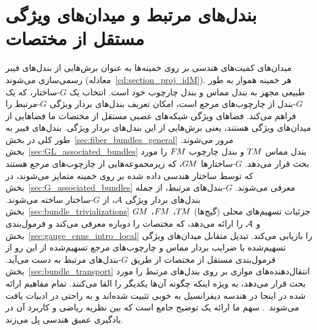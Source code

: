 \section{بندل‌های مرتبط و میدان‌های ویژگی مستقل از مختصات}
\label{sec:bundles_fields}
میدان‌های کمیت‌های هندسی بر روی خمینه‌ها به عنوان برش‌هایی از بندل‌های فیبر رسمی‌سازی می‌شوند (معادله~\eqref{cd:section_proj_idM}).
هر خمینه هموار به طور طبیعی مجهز به بندل مماس و بندل چارچوب خود است.
انتخاب یک $G$-ساختار، که یک $G$-بندل از چارچوب‌های مرجع است، امکان تعریف بندل‌های بردار ویژگی $G$-مرتبط را فراهم می‌کند.
فضاهای ویژگی شبکه‌های عصبی مستقل از مختصات ما فضاهایی از میدان‌های ویژگی هستند، یعنی برش‌هایی از این بندل‌های بردار ویژگی.
بندل‌های فیبر به طور کلی در بخش~\ref{sec:fiber_bundles_general} مرور می‌شوند.
بخش~\ref{sec:GL_associated_bundles} بندل مماس $T\mkern-1.5muM$ و بندل چارچوب $F\mkern-1.5muM$ را مورد بحث قرار می‌دهد.
$G$-ساختارها $G\mkern-1.4muM$، که زیرمجموعه‌هایی از چارچوب‌های مرجع هستند که توسط ساختار هندسی داده شده بر روی خمینه متمایز می‌شوند، در بخش~\ref{sec:G_associated_bundles} معرفی می‌شوند.
$G$-بندل‌های مرتبط، از جمله بندل‌های بردار ویژگی $\mathcal{A}$، از $G$-ساختار ساخته می‌شوند.
بخش~\ref{sec:bundle_trivializations} جزئیات تسهیم‌های محلی (گیج‌ها) $T\mkern-1.5muM$، $F\mkern-1.5muM$، $G\mkern-1.4muM$ و $\mathcal{A}$ را ارائه می‌دهد، که مختصات را دوباره معرفی می‌کند و فرمول‌بندی بخش~\ref{sec:gauge_cnns_intro_local} را بازیابی می‌کند.
تبدیل متقابل میدان‌های ویژگی تسهیم‌شده با ضرایب بردار مماس و چارچوب‌های مرجع تسهیم‌شده از این رو از فرمول‌بندی مستقل از مختصات از طریق $G$-بندل‌های مرتبط به دست می‌آید.
بخش~\ref{sec:bundle_transport} انتقال‌دهنده‌های موازی بر روی بندل‌های مرتبط را مورد بحث قرار می‌دهد، به ویژه اینکه چگونه آن‌ها یکدیگر را القا می‌کنند.
تمام مفاهیم ارائه شده در اینجا در هندسه دیفرانسیل به خوبی تثبیت شده‌اند و به راحتی در ادبیات یافت می‌شوند~\cite{schullerGeometricalAnatomy2016,nakahara2003geometry,husemollerFibreBundles1994a,steenrodTopologyFibreBundles,shoshichikobayashiFoundationsDifferentialGeometry1963,marshGaugeTheoriesFiber2016,wendlLectureNotesBundles2008,sternberg1999lectures,piccione2006theory,crainic2013GStructuresExamples}.
سهم ما ارائه یک توضیح جامع است که بین نظریه ریاضی و کاربرد آن در یادگیری عمیق هندسی پل می‌زند.